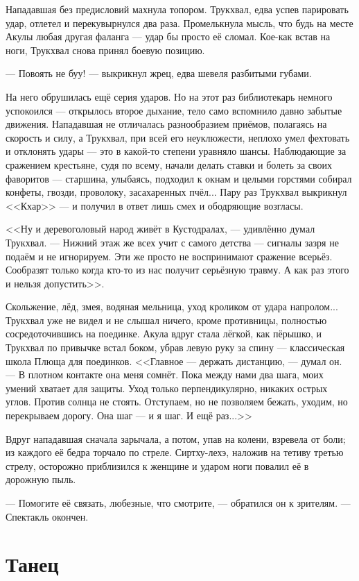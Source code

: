 Нападавшая без предисловий махнула топором.
Трукхвал, едва успев парировать удар, отлетел и перекувырнулся два раза.
Промелькнула мысль, что будь на месте Акулы любая другая фаланга --- удар бы просто её сломал.
Кое-как встав на ноги, Трукхвал снова принял боевую позицию.

--- Повоять не буу! --- выкрикнул жрец, едва шевеля разбитыми губами.

На него обрушилась ещё серия ударов.
Но на этот раз библиотекарь немного успокоился --- открылось второе дыхание, тело само вспомнило давно забытые движения.
Нападавшая не отличалась разнообразием приёмов, полагаясь на скорость и силу, а Трукхвал, при всей его неуклюжести, неплохо умел фехтовать и отклонять удары --- это в какой-то степени уравняло шансы.
Наблюдающие за сражением крестьяне, судя по всему, начали делать ставки и болеть за своих фаворитов --- старшина, улыбаясь, подходил к окнам и целыми горстями собирал конфеты, гвозди, проволоку, засахаренных пчёл...
Пару раз Трукхвал выкрикнул <<Кхар>> --- и получил в ответ лишь смех и ободряющие возгласы.

<<Ну и деревоголовый народ живёт в Кустодралах, --- удивлённо думал Трукхвал.
--- Нижний этаж же всех учит с самого детства --- сигналы зазря не подаём и не игнорируем.
Эти же просто не воспринимают сражение всерьёз.
Сообразят только когда кто-то из нас получит серьёзную травму.
А как раз этого и нельзя допустить>>.

Скольжение, лёд, змея, водяная мельница, уход кроликом от удара напролом...
Трукхвал уже не видел и не слышал ничего, кроме противницы, полностью сосредоточившись на поединке.
Акула вдруг стала лёгкой, как пёрышко, и Трукхвал по привычке встал боком, убрав левую руку за спину --- классическая школа Плюща для поединков.
<<Главное --- держать дистанцию, --- думал он.
--- В плотном контакте она меня сомнёт.
Пока между нами два шага, моих умений хватает для защиты.
Уход только перпендикулярно, никаких острых углов.
Против солнца не стоять.
Отступаем, но не позволяем бежать, уходим, но перекрываем дорогу.
Она шаг --- и я шаг.
И ещё раз...>>

Вдруг нападавшая сначала зарычала, а потом, упав на колени, взревела от боли;
из каждого её бедра торчало по стреле.
Сиртху-лехэ, наложив на тетиву третью стрелу, осторожно приблизился к женщине и ударом ноги повалил её в дорожную пыль.

--- Помогите её связать, любезные, что смотрите, --- обратился он к зрителям.
--- Спектакль окончен.

\section{Танец}


